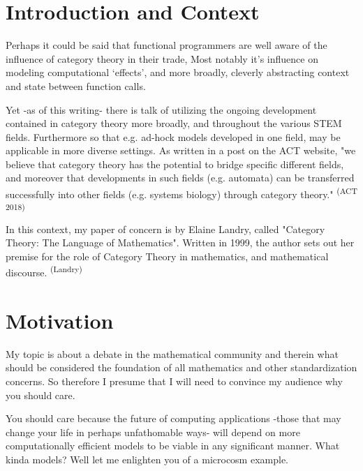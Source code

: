 \section*{Introduction and Context}

Perhaps it could be said that functional programmers are well aware of the influence of category theory in their trade, Most notably it’s influence on modeling computational ‘effects’, and more broadly, cleverly abstracting context and state between function calls. 

Yet -as of this writing- there is talk of utilizing the ongoing development contained in category theory more broadly, and throughout the various STEM fields. Furthermore so that e.g. ad-hock models developed in one field, may be applicable in more diverse settings. As written in a post on the ACT website, "we believe that category theory has the potential to bridge specific different fields, and moreover that developments in such fields (e.g. automata) can be transferred successfully into other fields (e.g. systems biology) through category theory." \textsuperscript{(ACT 2018)}

In this context, my paper of concern is by Elaine Landry, called "Category Theory: The Language of Mathematics". Written in 1999, the author sets out her premise for the role of Category Theory in mathematics, and mathematical discourse. \textsuperscript{(Landry)}

\section*{Motivation}

My topic is about a debate in the mathematical community and therein what should be considered the foundation of all mathematics and other standardization concerns. So therefore I presume that I will need to convince my audience why you should care.

You should care because the future of computing applications -those that may change your life in perhaps unfathomable ways- will depend on more computationally efficient models to be viable in any significant manner. What kinda models? Well let me enlighten you of a microcosm example.

